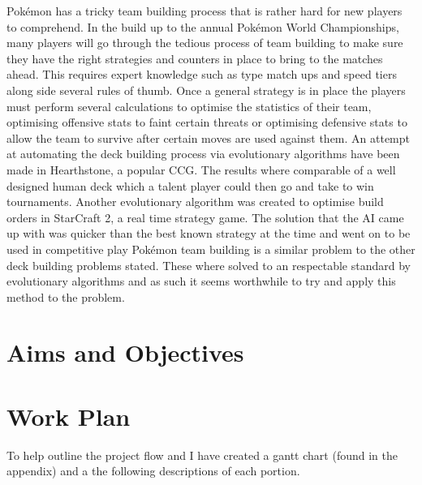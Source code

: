 \documentclass[a4paper]{article}
\newcommand{\Pokemon}{Pok\'{e}mon}
\begin{document}
\Pokemon{} has a tricky team building process that is rather hard for new players to comprehend. In the build up to the annual \Pokemon{} World Championships, many players will go through the tedious process of team building to make sure they have the right strategies and counters in place to bring to the matches ahead\cite{worldsOverview}. This requires expert knowledge such as type match ups and speed tiers along side several rules of thumb. Once a general strategy is in place the players must perform several calculations to optimise the statistics of their team, optimising offensive stats to faint certain threats or optimising defensive stats to allow the team to survive after certain moves are used against them.
An attempt at automating the deck building process via evolutionary algorithms have been made in Hearthstone, a popular CCG\cite{hearthstoneAI}. The results where comparable of a well designed human deck which a talent player could then go and take to win tournaments. Another evolutionary algorithm was created to optimise build orders in StarCraft 2, a real time strategy game. The solution that the AI came up with was quicker than the best known strategy at the time and went on to be used in competitive play\cite{starcraftEA}
\Pokemon{} team building is a similar problem to the other deck building problems stated. These where solved to an respectable standard by evolutionary algorithms and as such it seems worthwhile to try and apply this method to the problem.

\section{Aims and Objectives}
\lipsum[1]

\section{Work Plan}
To help outline the project flow and I have created a gantt chart (found in the appendix) and a the following descriptions of each portion.
\end{document}
